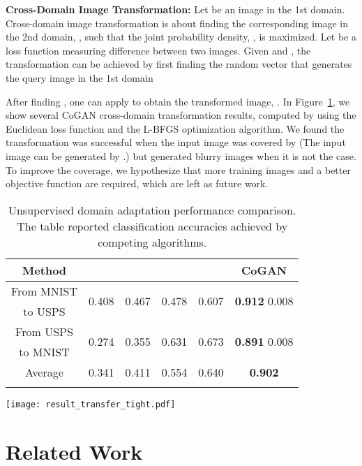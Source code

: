 \documentclass{article}
\begin{document}
{\bf Cross-Domain Image Transformation:} Let  be an image in the 1st domain. Cross-domain image transformation is about finding the corresponding image in the 2nd domain, , such that the joint probability density, , is maximized. Let  be a loss function measuring difference between two images. Given  and , the transformation can be achieved by first finding the random vector that generates the query image in the 1st domain 

After finding , one can apply  to obtain the transformed image, . In Figure~\ref{fig::result_transfer}, we show several CoGAN cross-domain transformation results, computed by using the Euclidean loss function and the L-BFGS optimization algorithm. We found the transformation was successful when the input image was covered by  (The input image can be generated by .) but generated blurry images when it is not the case. To improve the coverage, we hypothesize that more training images and a better objective function are required, which are left as future work.

\begin{table}[t!]
\begin{minipage}[c]{0.65\linewidth}
\centering
	\small
	\begin{tabular}{cccccc}
	Method & \cite{long2013transfer} & \cite{fernando2015joint} & \cite{tzeng2014deep} & \cite{rozantsev2016beyond} & CoGAN\\
	\hline
	From MNIST & \multirow{ 2}{*}{0.408} & \multirow{ 2}{*}{0.467} & \multirow{ 2}{*}{0.478} & \multirow{ 2}{*}{0.607} & \multirow{ 2}{*}{{\bf 0.912} 0.008}\\
	to USPS & \\	
	From USPS & \multirow{ 2}{*}{0.274} & \multirow{ 2}{*}{0.355} & \multirow{ 2}{*}{0.631} & \multirow{ 2}{*}{0.673} & \multirow{ 2}{*}{{\bf 0.891} 0.008}\\
	to MNIST & \\		
	Average                & 0.341 & 0.411 & 0.554 & 0.640 & {\bf 0.902}\\
	\hline\\
	\end{tabular}	
\caption{\small Unsupervised domain adaptation performance comparison. The table reported classification accuracies achieved by competing algorithms.}	
\label{tbl::uda}
\end{minipage}\hfill
\begin{minipage}[c]{0.30\linewidth}
\centering
\texttt{[image: result\_transfer\_tight.pdf]}    
\label{fig::result_transfer}
\end{minipage}
\end{table} \section{Related Work}\label{sec::rel}
\end{document}

